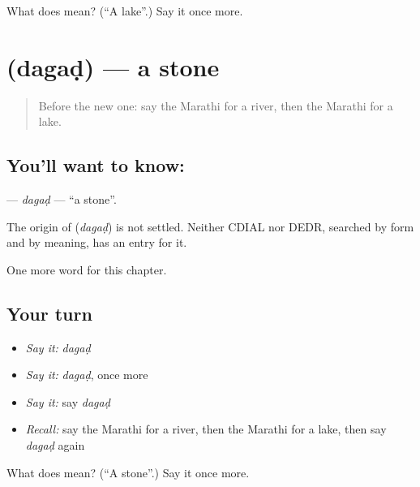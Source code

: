 \begin{tcolorbox}[breakable,colback=teal!4,colframe=teal!35!black,title={Before you move on}]
What does  mean? (\textquotedblleft{}A lake\textquotedblright{}.) Say it once more.
\end{tcolorbox}
\section[\texorpdfstring{\mr{दगड} (dagaḍ)}{दगड (dagaḍ)}]{ (dagaḍ) — a stone}

\label{lesson:MR-C97-dagad}



\begin{quote}
Before the new one: say the Marathi for a river, then the Marathi for a lake.
\end{quote}

\subsection*{You'll want to know: }
\textbf{} — \emph{dagaḍ} — \textquotedblleft{}a stone\textquotedblright{}.

\begin{cousinweb}
The origin of \textbf{} (\emph{dagaḍ}) is not settled. Neither CDIAL nor DEDR, searched by form and by meaning, has an entry for it.
\end{cousinweb}

\begin{grammarlens}[title={What you've built}]
One more word for this chapter.
\end{grammarlens}

\subsection*{Your turn}
\begin{itemize}
\raggedright
  \item \emph{Say it:} \emph{dagaḍ}
  \item \emph{Say it:} \emph{dagaḍ}, once more
  \item \emph{Say it:} say \emph{dagaḍ}
  \item \emph{Recall:} say the Marathi for a river, then the Marathi for a lake, then say \emph{dagaḍ} again
\end{itemize}

\begin{tcolorbox}[breakable,colback=teal!4,colframe=teal!35!black,title={Before you move on}]
What does  mean? (\textquotedblleft{}A stone\textquotedblright{}.) Say it once more.
\end{tcolorbox}

